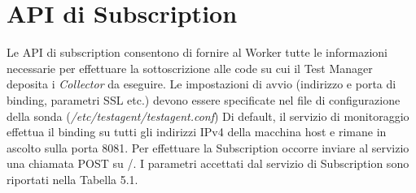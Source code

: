 \documentclass[../main.tex]{subfiles}
\begin{document}
\section{API di Subscription}
Le API di subscription consentono di fornire al Worker tutte le informazioni necessarie per effettuare la sottoscrizione alle code su cui il Test Manager deposita i \textit{Collector} da eseguire.
Le impostazioni di avvio (indirizzo e porta di binding, parametri SSL etc.) devono essere specificate nel file di configurazione della sonda (\textit{/etc/testagent/testagent.conf})
Di default, il servizio di monitoraggio effettua il binding su tutti gli indirizzi IPv4 della macchina host e rimane in ascolto sulla porta 8081.
Per effettuare la Subscription occorre inviare al servizio una chiamata POST su /.
I parametri accettati dal servizio di Subscription sono riportati nella Tabella 5.1.
\end{document}
